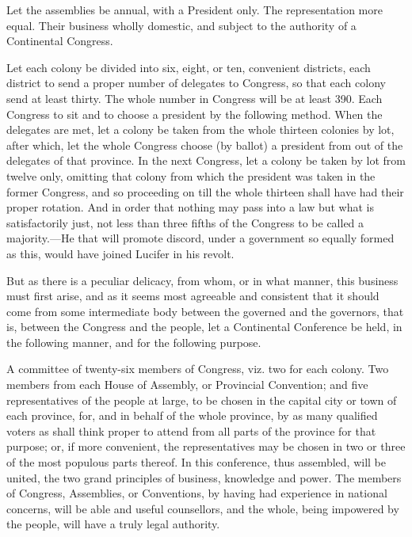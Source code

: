\documentclass[12pt,oneside]{memoir}
\begin{document}
Let the assemblies be annual, with a President only. The
representation more equal. Their business wholly domestic, and
subject to the authority of a Continental Congress.

Let each colony be divided into six, eight, or ten, convenient 
districts, each district to send a proper number of delegates to
Congress, so that each colony send at least thirty. The whole number
in Congress will be at least 390. Each Congress to sit and to choose
a president by the following method. When the delegates are met, let
a colony be taken from the whole thirteen colonies by lot, after
which, let the whole Congress choose (by ballot) a president from
out of the delegates of that province. In the next Congress, let a
colony be taken by lot from twelve only, omitting that colony from
which the president was taken in the former Congress, and so
proceeding on till the whole thirteen shall have had their proper
rotation. And in order that nothing may pass into a law but what is
satisfactorily just, not less than three fifths of the Congress to
be called a majority.---He that will promote discord, under a
government so equally formed as this, would have joined Lucifer in
his revolt.

But as there is a peculiar delicacy, from whom, or in what manner,
this business must first arise, and as it seems most agreeable and
consistent that it should come from some intermediate body between
the governed and the governors, that is, between the Congress and
the people, let a Continental Conference be held, in the following
manner, and for the following purpose.

A committee of twenty-six members of Congress, viz. two for each
colony. Two members from each House of Assembly, or Provincial
Convention; and five representatives of the people at large, to be
chosen in the capital city or town of each province, for, and in
behalf of the whole province, by as many qualified voters as shall
think proper to attend from all parts of the province for that
purpose; or, if more convenient, the representatives may be chosen
in two or three of the most populous parts thereof. In this
conference, thus assembled, will be united, the two grand principles
of business, knowledge and power. The members of Congress,
Assemblies, or Conventions, by having had experience in national
concerns, will be able and useful counsellors, and the whole, being
impowered by the people, will have a truly legal authority.
\end{document}
